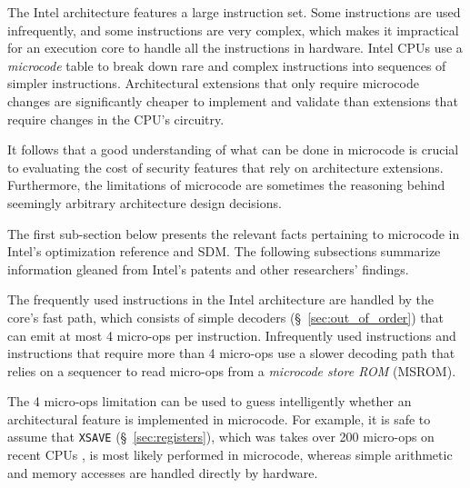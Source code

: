 \label{sec:microcode}


The Intel architecture features a large instruction set. Some instructions are
used infrequently, and some instructions are very complex, which makes it
impractical for an execution core to handle all the instructions in hardware.
Intel CPUs use a \textit{microcode} table to break down rare and complex
instructions into sequences of simpler instructions. Architectural extensions
that only require microcode changes are significantly cheaper to implement
and validate than extensions that require changes in the CPU's circuitry.

It follows that a good understanding of what can be done in microcode is
crucial to evaluating the cost of security features that rely on architecture
extensions. Furthermore, the limitations of microcode are sometimes the
reasoning behind seemingly arbitrary architecture design decisions.

The first sub-section below presents the relevant facts pertaining to microcode
in Intel's optimization reference \cite{intel2014optimization} and SDM. The
following subsections summarize information gleaned from Intel's patents and
other researchers' findings.


\label{sec:microcode_role}


The frequently used instructions in the Intel architecture are handled by the
core's fast path, which consists of simple decoders (\S~\ref{sec:out_of_order})
that can emit at most 4 micro-ops per instruction. Infrequently used
instructions and instructions that require more than 4 micro-ops use a slower
decoding path that relies on a sequencer to read micro-ops from a
\textit{microcode store ROM} (MSROM).

The 4 micro-ops limitation can be used to guess intelligently whether an
architectural feature is implemented in microcode. For example, it is safe to
assume that \texttt{XSAVE} (\S~\ref{sec:registers}), which was takes over 200
micro-ops on recent CPUs \cite{fog2014microops}, is most likely performed in
microcode, whereas simple arithmetic and memory accesses are handled directly
by hardware.

